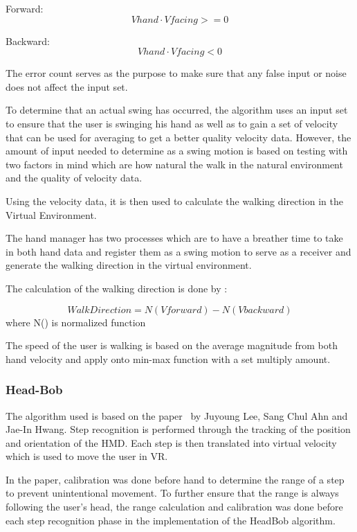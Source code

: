 \documentclass[manuscript,review,anonymous]{acmart}
\begin{document}
Forward: \[ \displaystyle Vhand \cdot Vfacing >= 0\]

Backward: \[ \displaystyle Vhand \cdot Vfacing < 0\]

The error count serves as the purpose to make sure that any false input or noise does not affect the input set.

To determine that an actual swing has occurred, the algorithm uses an input set to ensure that the user is swinging his hand as well as to gain a set of velocity that can be used for averaging to get a better quality velocity data. However, the amount of input needed to determine as a swing motion is based on testing with two factors in mind which are how natural the walk in the natural environment and the quality of velocity data. 

Using the velocity data, it is then used to calculate the walking direction in the Virtual Environment.

The hand manager has two processes which are to have a breather time to take in both hand data and register them as a swing motion to serve as a receiver and generate the walking direction in the virtual environment.

The calculation of the walking direction is done by :

\[ \displaystyle WalkDirection = N(Vforward) - N(Vbackward)\]
where N() is normalized function

The speed of the user is walking is based on the average magnitude from both hand velocity and apply onto min-max function with a set multiply amount.


\subsubsection{Head-Bob}
The algorithm used is based on the paper~\cite{headBob2018} by Juyoung Lee, Sang Chul Ahn and Jae-In Hwang. Step recognition is performed through the tracking of the position and orientation of the HMD. Each step is then translated into virtual velocity which is used to move the user in VR.

In the paper, calibration was done before hand to determine the range of a step to prevent unintentional movement. To further ensure that the range is always following the user's head, the range calculation and calibration was done before each step recognition phase in the implementation of the HeadBob algorithm.


\end{document}
